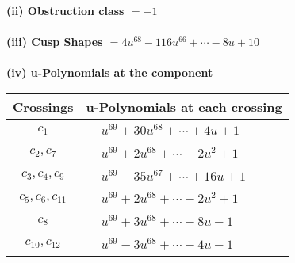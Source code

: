 \documentclass[1p]{elsarticle_modified}
\theoremstyle{definition}
\begin{document}
\flushleft \textbf{(ii) Obstruction class $= -1$}\\~\\
\flushleft \textbf{(iii) Cusp Shapes $= 4 u^{68}-116 u^{66}+\cdots-8 u+10$}\\~\\
\newpage\renewcommand{\arraystretch}{1}
\flushleft \textbf{(iv) u-Polynomials at the component}\newline \\
\begin{tabular}{m{50pt}|m{274pt}}
Crossings & \hspace{64pt}u-Polynomials at each crossing \\
\hline $$\begin{aligned}c_{1}\end{aligned}$$&$\begin{aligned}
&u^{69}+30 u^{68}+\cdots+4 u+1
\end{aligned}$\\
\hline $$\begin{aligned}c_{2},c_{7}\end{aligned}$$&$\begin{aligned}
&u^{69}+2 u^{68}+\cdots-2 u^2+1
\end{aligned}$\\
\hline $$\begin{aligned}c_{3},c_{4},c_{9}\end{aligned}$$&$\begin{aligned}
&u^{69}-35 u^{67}+\cdots+16 u+1
\end{aligned}$\\
\hline $$\begin{aligned}c_{5},c_{6},c_{11}\end{aligned}$$&$\begin{aligned}
&u^{69}+2 u^{68}+\cdots-2 u^2+1
\end{aligned}$\\
\hline $$\begin{aligned}c_{8}\end{aligned}$$&$\begin{aligned}
&u^{69}+3 u^{68}+\cdots-8 u-1
\end{aligned}$\\
\hline $$\begin{aligned}c_{10},c_{12}\end{aligned}$$&$\begin{aligned}
&u^{69}-3 u^{68}+\cdots+4 u-1
\end{aligned}$\\
\hline
\end{tabular}\\~\\
\end{document}
